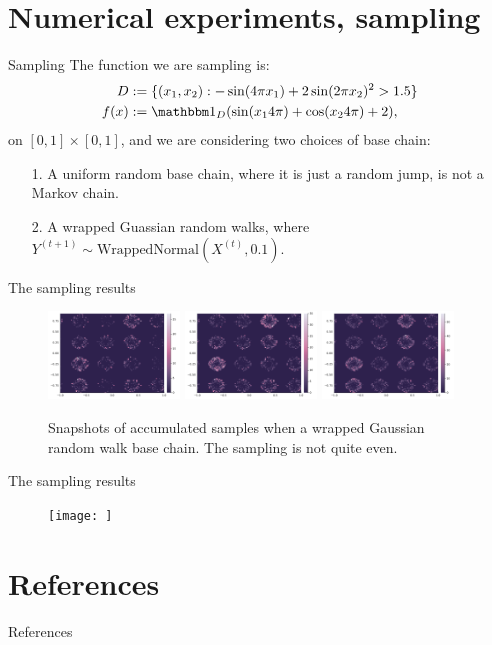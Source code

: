 \documentclass[11pt]{beamer}
\begin{document}
\section{Numerical experiments, sampling}
    \begin{frame}{Sampling}
        The function we are sampling is: 
        \begin{align*}
            D &:= \{(x_1, x_2): -\sin(4\pi x_1) + 2\sin(2\pi x_2)^2 > 1.5\}
            \\
            f(x) &:= \mathbbm 1_D (\sin(x_14\pi) + \cos(x_24\pi) + 2), 
        \end{align*}
        on $[0, 1]\times [0, 1]$, and we are considering two choices of base chain: 
        \begin{itemize}
            \item [1.] A uniform random base chain, where it is just a random jump, is not a Markov chain. 
            \item [2.] A wrapped Guassian random walks, where $Y^{(t + 1)} \sim \text{WrappedNormal}(X^{(t)}, 0.1)$. 
        \end{itemize}
    \end{frame}
    \begin{frame}{The sampling results}
        \begin{figure}
            \centering
            \includegraphics[width=3.5cm]{gaussian_base(1).png}
            \includegraphics[width=3.5cm]{gaussian_base(2).png}
            \includegraphics[width=3.5cm]{gaussian_base(3).png}
            \caption{Snapshots of accumulated samples when a wrapped Gaussian random walk base chain. The sampling is not quite even. }
            \label{fig:gaussian_rand_bc}
        \end{figure}
    \end{frame}
    \begin{frame}{The sampling results}
        \begin{figure}[h]
            \centering
            \texttt{[image: ]}
            \caption{}
            \label{}
        \end{figure}
        
    \end{frame}
    

\section{References}
    \begin{frame}{References}
        
    \end{frame}
\end{document}
